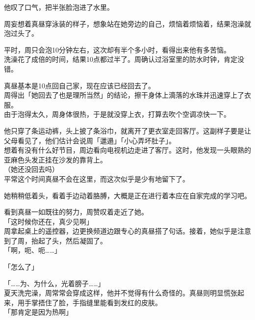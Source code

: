 他叹了口气，把半张脸泡进了水里。\\

\vspace{2\baselineskip}

周妄想着真昼穿泳装的样子，想象站在她旁边的自己，烦恼着烦恼着，结果泡澡就泡过头了。

平时，周只会泡10分钟左右，这次却有半个多小时，看得出来他有多苦恼。\\

洗澡花了成倍的时间，结果10点都过半了。周确认过浴室里的防水时钟，肯定没错。

真昼基本是10点回自己家，现在应该已经回去了。\\

周得出「她回去了也是理所当然」的结论，擦干身体上滴落的水珠并迅速穿上了衣服。\\

由于泡得太久，周身体很热，于是就没穿上衣，打算去吹个空调凉快一下。

他只穿了条运动裤，头上披了条浴巾，就离开了更衣室走回客厅。这副样子要是让父母看见了，他们估计会说周「邋遢」「小心弄坏肚子」。\\

想着有没有什么好节目，周边看向电视机边走进了客厅。这时，他发现一头眼熟的亚麻色头发正挂在沙发的靠背上。\\

（她还没回去吗）\\

平常这个时间真昼不会在这里，而这次似乎是少有地留下了。

她稍稍低着头，看着手边动着胳膊，大概是正在进行着本应在自家完成的学习吧。

看到真昼一如既往的努力，周赞叹着走近了她。\\

「这时候你还在，真少见啊」\\

周拿起桌上的遥控器，边更换频道边跟专心的真昼搭了句话。接着，她似乎是注意到了周，抬起了头，然后凝固了。\\

「啊，呃、呃……」

「怎么了」

「……为、为什么，光着膀子……」\\

夏天洗完澡，周常常会穿成这样，他并不觉得有什么奇怪的。真昼则明显慌张起来，用手掌捂住了脸，手指缝里能看到发红的皮肤。\\

「那肯定是因为热啊」

